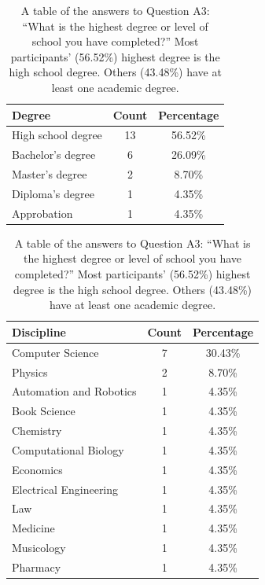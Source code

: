 \begin{table}[H]
	\centering
	\begin{subtable}[b]{.48\textwidth}
		\footnotesize
		\centering
		\begin{tabular}[b]{l c c}
			\toprule
			Degree             & Count & Percentage \\
			\midrule
			High school degree & 13    & 56.52\%    \\
			Bachelor's degree  & 6     & 26.09\%    \\
			Master's degree    & 2     & 8.70\%     \\
			Diploma's degree   & 1     & 4.35\%     \\
			Approbation        & 1     & 4.35\%     \\
			\bottomrule
		\end{tabular}
		\caption{A table of the answers to Question A3: \enquote{What is the highest degree or level of school you have completed?} Most participants' (56.52\%) highest degree is the high school degree. Others (43.48\%) have at least one academic degree.}\label{tab:sus-degree}
  \end{subtable}%
  \hspace{0.04\textwidth}%
	\begin{subtable}[b]{.48\textwidth}
		\footnotesize
		\centering
		\begin{tabular}[b]{l c c}
			\toprule
			Discipline              & Count & Percentage \\
			\midrule
			Computer Science        & 7     & 30.43\%    \\
			Physics                 & 2     & 8.70\%     \\
			Automation and Robotics & 1     & 4.35\%     \\
			Book Science            & 1     & 4.35\%     \\
			Chemistry               & 1     & 4.35\%     \\
			Computational Biology   & 1     & 4.35\%     \\
			Economics               & 1     & 4.35\%     \\
			Electrical Engineering  & 1     & 4.35\%     \\
			Law                     & 1     & 4.35\%     \\
			Medicine                & 1     & 4.35\%     \\
			Musicology              & 1     & 4.35\%     \\
			Pharmacy                & 1     & 4.35\%     \\

\end{tabular}
\end{subtable}
\end{table}
